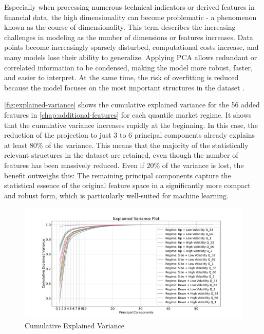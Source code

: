 Especially when processing numerous technical indicators or derived features in financial data, the high dimensionality can become problematic - a phenomenon known as the course of dimensionality.
This term describes the increasing challenges in modeling as the number of dimensions or features increases.
Data points become increasingly sparsely disturbed, computational costs increase, and many models lose their ability to generalize.
Applying PCA allows redundant or correlated information to be condensed, making the model more robust, faster, and easier to interpret.
At the same time, the risk of overfitting is reduced because the model focuses on the most important structures in the dataset \cite{wikipedia-curse-od-dimensionality}.

\autoref{fig:explained-variance} shows the cumulative explained variance for the 56 added features in \autoref{chap:additional-features} for each quantile market regime.
It shows that the cumulative variance increases rapidly at the beginning.
In this case, the reduction of the projection to just 3 to 6 principal components already explains at least 80\% of the variance.
This means that the majority of the statistically relevant structures in the dataset are retained, even though the number of features has been massively reduced.
Even if 20\% of the variance is lost, the benefit outweighs this: The remaining principal components capture the statistical essence of the original feature space in a significantly more compact and robust form, which is particularly well-suited for machine learning.


\begin{figure}[H]
    \centering
    \includegraphics[width=\textwidth]{images/eda/explained_variance}
    \caption{Cumulative Explained Variance}
    \label{fig:explained-variance}
\end{figure}

